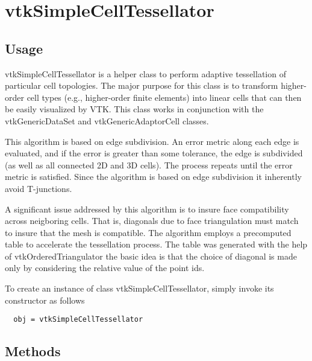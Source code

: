 \section{vtkSimpleCellTessellator}

\subsection{Usage}

 vtkSimpleCellTessellator is a helper class to perform adaptive tessellation
 of particular cell topologies. The major purpose for this class is to
 transform higher-order cell types (e.g., higher-order finite elements)
 into linear cells that can then be easily visualized by VTK. This class
 works in conjunction with the vtkGenericDataSet and vtkGenericAdaptorCell
 classes.

 This algorithm is based on edge subdivision. An error metric along each
 edge is evaluated, and if the error is greater than some tolerance, the
 edge is subdivided (as well as all connected 2D and 3D cells). The process
 repeats until the error metric is satisfied. Since the algorithm is based
 on edge subdivision it inherently avoid T-junctions.

 A significant issue addressed by this algorithm is to insure face
 compatibility across neigboring cells. That is, diagonals due to face
 triangulation must match to insure that the mesh is compatible. The
 algorithm employs a precomputed table to accelerate the tessellation
 process. The table was generated with the help of vtkOrderedTriangulator
 the basic idea is that the choice of diagonal is made only by considering the
 relative value of the point ids.


To create an instance of class vtkSimpleCellTessellator, simply
invoke its constructor as follows
\begin{verbatim}
  obj = vtkSimpleCellTessellator
\end{verbatim}
\subsection{Methods}

